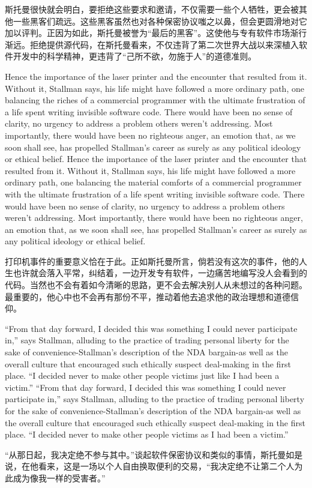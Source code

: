 \ifdefined\chs
斯托曼很快就会明白，要拒绝这些要求和邀请，不仅需要一些个人牺牲，更会被其他一些黑客们疏远。这些黑客虽然也对各种保密协议嗤之以鼻，但会更圆滑地对它加以评判。正因为如此，斯托曼被誉为``最后的黑客''。这使他与专有软件市场渐行渐远。拒绝提供源代码，在斯托曼看来，不仅违背了第二次世界大战以来深植入软件开发中的科学精神，更违背了``己所不欲，勿施于人''的道德准则。
\fi

\ifdefined\eng
\ifdefined\vone
Hence the importance of the laser printer and the encounter that resulted from it. Without it, Stallman says, his life might have followed a more ordinary path, one balancing the riches of a commercial programmer with the ultimate frustration of a life spent writing invisible software code. There would have been no sense of clarity, no urgency to address a problem others weren't addressing. Most importantly, there would have been no righteous anger, an emotion that, as we soon shall see, has propelled Stallman's career as surely as any political ideology or ethical belief.
\fi
\ifdefined\vtwo
Hence the importance of the laser printer and the encounter that resulted from it. Without it, Stallman says, his life might have followed a more ordinary path, one balancing the material comforts of a commercial programmer with the ultimate frustration of a life spent writing invisible software code. There would have been no sense of clarity, no urgency to address a problem others weren't addressing. Most importantly, there would have been no righteous anger, an emotion that, as we soon shall see, has propelled Stallman's career as surely as any political ideology or ethical belief.
\fi
\fi

\ifdefined\chs
打印机事件的重要意义恰在于此。正如斯托曼所言，倘若没有这次的事件，他的人生也许就会落入平常，纠结着，一边开发专有软件，一边痛苦地编写没人会看到的代码。当然也不会有着如今清晰的思路，更不会去解决别人从未想过的各种问题。最重要的，他心中也不会再有那份不平，推动着他去追求他的政治理想和道德信仰。 
\fi

\ifdefined\eng
\ifdefined\vone
``From that day forward, I decided this was something I could never participate in,'' says Stallman, alluding to the practice of trading personal liberty for the sake of convenience-Stallman's description of the NDA bargain-as well as the overall culture that encouraged such ethically suspect deal-making in the first place. ``I decided never to make other people victims just like I had been a victim.''
\fi
\ifdefined\vtwo
``From that day forward, I decided this was something I could never participate in,'' says Stallman, alluding to the practice of trading personal liberty for the sake of convenience-Stallman's description of the NDA bargain-as well as the overall culture that encouraged such ethically suspect deal-making in the first place. ``I decided never to make other people victims as I had been a victim.''
\fi
\fi

\ifdefined\chs
``从那日起，我决定绝不参与其中。''谈起软件保密协议和类似的事情，斯托曼如是说，在他看来，这是一场以个人自由换取便利的交易，``我决定绝不让第二个人为此成为像我一样的受害者。''
\fi

\theendnotes
\setcounter{endnote}{0}
